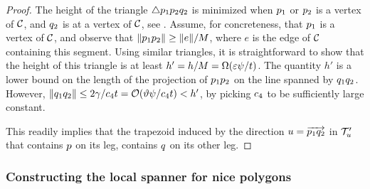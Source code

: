 \documentclass[12pt]{article}%
\begin{document}
\begin{proof}
    The height of the triangle $\triangle p_1 p_2 q_2$ is
    minimized when $p_1$ or $p_2$ is a vertex of $\mathcal{C}$, and
    $q_2$ is at a vertex of $\mathcal{C}$, see
    . Assume, for concreteness, that $p_1$ is a
    vertex of $\mathcal{C}$, and observe that
    $\left\| p_1 p_2 \right\| \geq \| e\|/M$, where $e$ is the edge of
    $\mathcal{C}$ containing this segment. Using similar triangles, it is
    straightforward to show that the height of this triangle is at
    least $h' = h/M = \Omega( \varepsilon \psi/t )$. The quantity $h'$ is a
    lower bound on the length of the projection of $p_1 p_2$ on
    the line spanned by $q_1 q_2$. However,
    $\left\| q_1 q_2 \right\| \leq 2\gamma/c_4 t = \mathcal{O}( \vartheta \psi
    /c_4 t) < h'$, by picking $c_4$ to be sufficiently large
    constant.

    This readily implies that the trapezoid induced by the direction
    $ u = \overrightarrow{p_1 q_2}$ in $\mathcal{T}_u'$ that contains
    $p$ on its leg, contains $q$ on its other leg.
\end{proof}



\subsubsection{Constructing the local spanner for nice %
   polygons}
\end{document}
